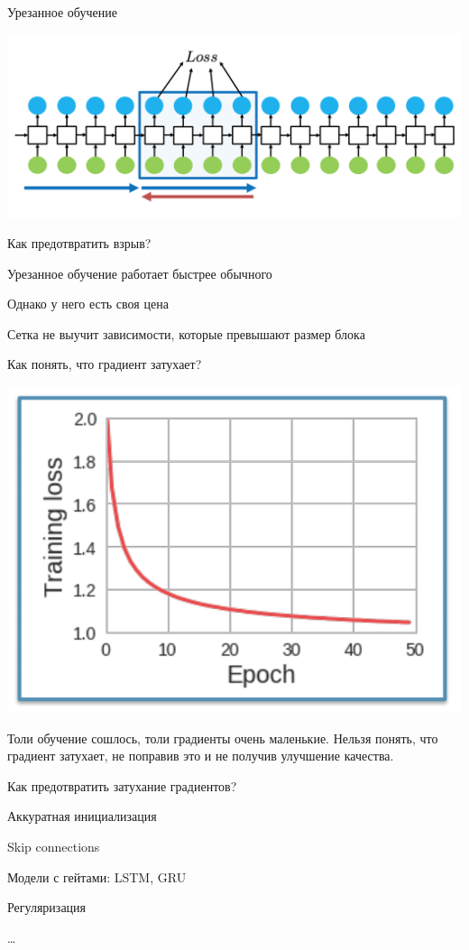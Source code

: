 \documentclass[notes,12pt, aspectratio=169]{beamer}
\newenvironment{wideitemize}{\itemize\addtolength{\itemsep}{10pt}}{\enditemize}
\begin{document}
\begin{frame}{Урезанное обучение}
\begin{center}
	\includegraphics[width=.9\linewidth]{rnn12.png}
\end{center}
\end{frame}


\begin{frame}{Как предотвратить взрыв?}
	\begin{wideitemize} 
		\item Урезанное обучение работает быстрее обычного
		\item Однако у него есть своя цена
		\item Сетка не выучит зависимости, которые превышают размер блока 
	\end{wideitemize} 
\end{frame}


\begin{frame}{Как понять, что градиент затухает?}
\begin{center}
	\includegraphics[width=.5\linewidth]{rnn9_1.png}
\end{center}
Толи обучение сошлось, толи градиенты очень маленькие. Нельзя понять, что градиент затухает, не поправив это и не получив улучшение качества. 
\end{frame}

\begin{frame}{Как предотвратить затухание градиентов?}
\begin{wideitemize} 
	\item Аккуратная инициализация 
	\item Skip connections
	\item Модели с гейтами: LSTM, GRU
	\item Регуляризация
	\item \ldots 
\end{wideitemize} 
\end{frame}
\end{document}
